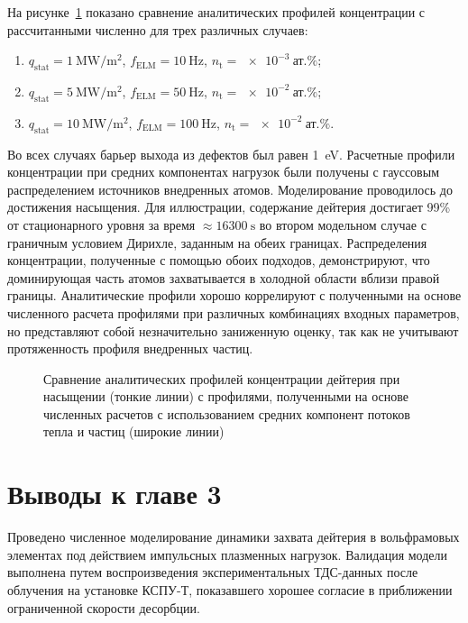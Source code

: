 На рисунке~\cref{fig:ch3/retention_saturation} показано сравнение аналитических профилей концентрации с рассчитанными численно для трех различных случаев:
\begin{enumerate}[beginpenalty=10000]
	\item $q_{\mathrm{stat}}=\SI{1}{\mega\watt\per\meter\squared}$, $f_{\mathrm{ELM}}=\SI{10}{\hertz}$, $n_{\mathrm{t}}=\SI{e-3}{\text{ат.}\percent}$;
	\item $q_{\mathrm{stat}}=\SI{5}{\mega\watt\per\meter\squared}$, $f_{\mathrm{ELM}}=\SI{50}{\hertz}$, $n_{\mathrm{t}}=\SI{e-2}{\text{ат.}\percent}$;
	\item $q_{\mathrm{stat}}=\SI{10}{\mega\watt\per\meter\squared}$, $f_{\mathrm{ELM}}=\SI{100}{\hertz}$, $n_{\mathrm{t}}=\SI{e-2}{\text{ат.}\percent}$.	
\end{enumerate}
Во всех случаях барьер выхода из дефектов был равен \SI{1}{\electronvolt}. Расчетные профили концентрации при средних компонентах нагрузок были получены с гауссовым распределением источников внедренных атомов. Моделирование проводилось до достижения насыщения. Для иллюстрации, содержание дейтерия достигает 99\% от стационарного уровня за время $\approx\SI{16300}{\second}$ во втором модельном случае с граничным условием Дирихле, заданным на обеих границах. Распределения концентрации, полученные с помощью обоих подходов, демонстрируют, что доминирующая часть атомов захватывается в холодной области вблизи правой границы. Аналитические профили хорошо коррелируют с полученными на основе численного расчета профилями при различных комбинациях входных параметров, но представляют собой незначительно заниженную оценку, так как не учитывают протяженность профиля внедренных частиц. 

\begin{figure}[ht]
	\caption{Сравнение аналитических профилей концентрации дейтерия при насыщении (тонкие линии) с профилями, полученными на основе численных расчетов с использованием средних компонент потоков тепла и частиц (широкие линии)}\label{fig:ch3/retention_saturation}
\end{figure}


\section{Выводы к главе 3}
Проведено численное моделирование динамики захвата дейтерия в вольфрамовых элементах под действием импульсных плазменных нагрузок. Валидация модели выполнена путем воспроизведения экспериментальных ТДС-данных после облучения на установке КСПУ-Т, показавшего хорошее согласие в приближении ограниченной скорости десорбции.   

